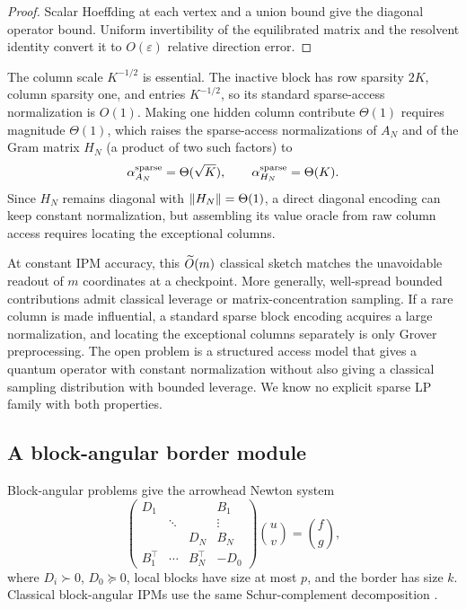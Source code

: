\begin{proof}
Scalar Hoeffding at each vertex and a union bound give the diagonal operator
bound.  Uniform invertibility of the equilibrated matrix and the resolvent
identity convert it to $O(\varepsilon)$ relative direction error.
\end{proof}

The column scale $K^{-1/2}$ is essential.  The inactive block has row sparsity $2K$,
column sparsity one, and entries $K^{-1/2}$, so its standard sparse-access
normalization is $O(1)$.  Making one hidden column contribute $\Theta(1)$
requires magnitude $\Theta(1)$, which raises the sparse-access normalizations
of $A_N$ and of the Gram matrix $H_N$ (a product of two such factors) to
\begin{equation}
 \alpha_{A_N}^{\rm sparse}=\Theta(\sqrt K),\qquad
 \alpha_{H_N}^{\rm sparse}=\Theta(K).                    \label{eq:positive-rare-normalization}
\end{equation}
Since $H_N$ remains diagonal with $\lVert H_N\rVert=\Theta(1)$, a direct diagonal
encoding can keep constant normalization, but assembling its value oracle
from raw column access requires locating the exceptional columns.

At constant IPM accuracy, this $\widetilde{O}(m)$ classical sketch matches the
unavoidable readout of $m$ coordinates at a checkpoint.  More generally, well-spread bounded contributions admit
classical leverage or matrix-concentration sampling.  If a rare column is made
influential, a standard sparse block encoding acquires a large normalization,
and locating the exceptional columns separately is only Grover preprocessing.  The
open problem is a structured access model that gives a quantum operator with
constant normalization without also giving a classical sampling distribution
with bounded leverage.  We know no explicit sparse LP family with both
properties.

\subsection{A block-angular border module}
\label{sec:positive-block-angular}

Block-angular problems give the arrowhead Newton system
\begin{equation}
 \begin{pmatrix}
 D_1&&&B_1\\&\ddots&&\vdots\\&&D_N&B_N\\
 B_1^\top&\cdots&B_N^\top&-D_0
 \end{pmatrix}\binom uv=\binom fg,                      \label{eq:positive-arrowhead}
\end{equation}
where $D_i\succ0$, $D_0\succeq0$, local blocks have size at most $p$, and
the border has size $k$.  Classical block-angular IPMs use the same Schur-complement
decomposition \cite{birge1988-computing-block-angular-karmarkar-projections,
grigoriadis1996-an-interior-point-method-for,
kempke2026-massively-parallel-interior-point-method-arrowhead}.

